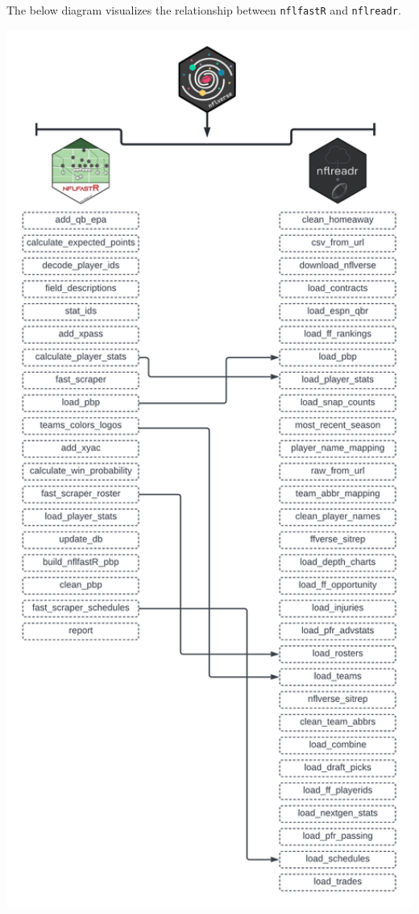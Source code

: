 \documentclass[
  letterpaper,
]{krantz}
\begin{document}
The below diagram visualizes the relationship between \texttt{nflfastR}
and \texttt{nflreadr}.

\includegraphics[width=1\textwidth,height=\textheight]{images/updated-diagram.png}
\end{document}
